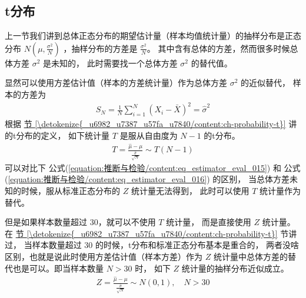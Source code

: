 \documentclass[letterpaper,10pt,english]{sphinxmanual}
\begin{document}
\subsection{t分布}
\label{\detokenize{_u63a8_u65ad_u4e0e_u68c0_u9a8c/content:t}}\label{\detokenize{_u63a8_u65ad_u4e0e_u68c0_u9a8c/content:ch-sample-distribution-t}}
上一节我们讲到总体正态分布的期望估计量（样本均值统计量）的抽样分布是正态分布 \(N(\mu,\frac{\sigma^2}{N})\)
，抽样分布的方差是 \(\frac{\sigma^2}{N}\)。
其中含有总体的方差，然而很多时候总体方差 \(\sigma^2\) 是未知的，
此时需要找一个总体方差 \(\sigma^2\) 的替代值。

显然可以使用方差估计值（样本的方差统计量）作为总体方差 \(\sigma^2\) 的近似替代，
样本的方差为
\begin{equation}\label{equation:推断与检验/content:推断与检验/content:7}
\begin{split}S_N = \frac{1}{N} \sum_{i=1}^N (X_i-\bar{X})^2 = \hat{\sigma}^2\end{split}
\end{equation}
根据 \hyperref[\detokenize{_u6982_u7387_u57fa_u7840/content:ch-probability-t}]{节 \ref{\detokenize{_u6982_u7387_u57fa_u7840/content:ch-probability-t}}} 讲的t\sphinxhyphen{}分布的定义，
如下统计量 \(T\) 是服从自由度为 \(N-1\) 的t\sphinxhyphen{}分布。
\begin{equation}\label{equation:推断与检验/content:eq_estimator_eval_016}
\begin{split} T = \frac{\hat{\mu} - \mu}{ \frac{\hat{\sigma}}{\sqrt{N} }} \sim T(N-1)\end{split}
\end{equation}
可以对比下 公式(\ref{equation:推断与检验/content:eq_estimator_eval_015}) 和 公式(\ref{equation:推断与检验/content:eq_estimator_eval_016}) 的区别，
当总体方差未知的时候，服从标准正态分布的 \(Z\) 统计量无法得到，
此时可以使用 \(T\) 统计量作为替代。

但是如果样本数量超过 \(30\)，就可以不使用 \(T\) 统计量，
而是直接使用 \(Z\) 统计量。
在 \hyperref[\detokenize{_u6982_u7387_u57fa_u7840/content:ch-probability-t}]{节 \ref{\detokenize{_u6982_u7387_u57fa_u7840/content:ch-probability-t}}} 节讲过，
当样本数量超过 \(30\) 的时候，t分布和标准正态分布基本是重合的，
两者没啥区别，也就是说此时使用方差估计值（样本方差）作为 \(Z\)
统计量中总体方差的替代也是可以。即当样本数量 \(N>30\) 时，
如下 \(Z\) 统计量的抽样分布近似成立。
\begin{equation}\label{equation:推断与检验/content:推断与检验/content:8}
\begin{split}Z = \frac{\hat{\mu} - \mu}{ \frac{\hat{\sigma}}{\sqrt{N} }} \sim N(0,1), \quad N > 30\end{split}
\end{equation}
\end{document}
